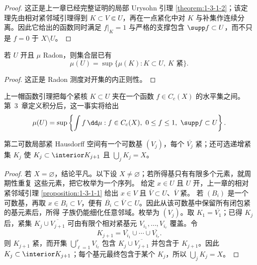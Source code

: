 \begin{proof}
这正是上一章已经完整证明的局部 Urysohn 引理
\ref{theorem:1-3-1-2}；该定理先由相对紧邻域引理得到
$K\subset V\Subset U$，再在一点紧化中对 $K$ 与补集作连续分离。因此它给出的函数同时满足
$f|_K=1$ 与严格的支撑包含 $\supp f\subset U$，而不只是 $f=0$ 于 $X\setminus U$。
\end{proof}

\begin{lemma}\label{lemma:2-2-2-1}
若 $U$ 开且 $\mu$ Radon，则集合层已有
\[
 \mu(U)=\sup\{\mu(K):K\subset U,\ K\text{ 紧}\}.
 \label{eq:radon-open-set-skeleton}
\]
\end{lemma}

\begin{proof}
这正是 Radon 测度对开集的内正则性。
\end{proof}

\begin{remark}[连续函数形式]
上一帽函数引理把每个紧核 \(K\subset U\) 夹在一个函数
\(f\in C_c(X)\) 的水平集之间。第~3~章定义积分后，这一事实将给出
\[
 \mu(U)=\sup\left\{\int f\,\dd\mu:
 f\in C_c(X),\ 0\le f\le1,\ \supp f\subset U\right\}.
 \label{eq:radon-open-function-future}
\]
\end{remark}

\begin{lemma}[可数相对紧基]\label{lem:radon-relative-compact-base}
第二可数局部紧 Hausdorff 空间有一个可数基 $(V_j)$，每个 $\overline{V_j}$ 紧；还可选递增紧集
$K_j$ 使 $K_j\subset\interior K_{j+1}$ 且 $\bigcup_jK_j=X$。
\end{lemma}

\begin{proof}
若 $X=\varnothing$，结论平凡。以下设 $X\ne\varnothing$；若所得基只有有限多个元素，就周期性重复
这些元素，把它枚举为一个序列。
给定 $x\in U$ 且 $U$ 开，上一章的相对紧邻域引理
\ref{proposition:1-3-1-1} 给出 $x\in V$ 且 $\overline V\subset U$、$\overline V$ 紧。
若 $(B_i)$ 是一个可数基，再取 $x\in B_i\subset V$，便有
$\overline{B_i}\subset\overline V\subset U$。因此从该可数基中保留所有闭包紧的基元素后，所得
子族仍能细化任意邻域。枚举为 $(V_j)$。取 $K_1=\overline{V_1}$；已得 $K_j$ 后，紧集
$K_j\cup\overline{V_{j+1}}$ 可由有限个相对紧基元
$V_{i_1},\ldots,V_{i_r}$ 覆盖。令
\[
 K_{j+1}=\overline{V_{i_1}}\cup\cdots\cup\overline{V_{i_r}}.
\]
则 $K_{j+1}$ 紧，而开集 $\bigcup_{\ell=1}^rV_{i_\ell}$ 包含
$K_j\cup\overline{V_{j+1}}$ 并包含于 $K_{j+1}$。因此
$K_j\subset\interior K_{j+1}$；每个基元最终包含于某个 $K_j$，所以
$\bigcup_jK_j=X$。
\end{proof}

